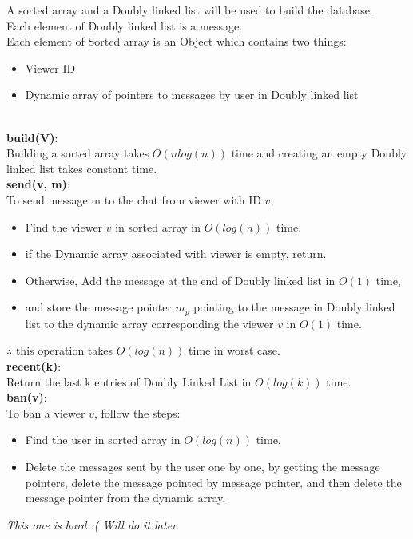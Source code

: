 \documentclass[12pt,twoside]{article}
\begin{document}
\begin{problems}
\newpage
\problem  %
A sorted array and a Doubly linked list will be used to build the database. \\
Each element of Doubly linked list is a message. \\
Each element of Sorted array is an Object which contains two things:
\begin{itemize}
    \item Viewer ID
    \item Dynamic array of pointers to messages by user in Doubly linked list
\end{itemize}
\\
\textbf{build(V)}:\\
Building a sorted array takes $O(nlog(n))$ time and creating an empty Doubly linked list takes constant time. \\

\textbf{send(v, m)}: \\
To send message m to the chat from viewer with ID $v$, \\
\begin{itemize}
    \item Find the viewer $v$ in sorted array in $O(log(n))$ time.
    \item if the Dynamic array associated with viewer is empty, return.
    \item Otherwise, Add the message at the end of Doubly linked list in $O(1)$ time,
    \item and store the message pointer $m_p$ pointing to the message in Doubly linked list to the dynamic array corresponding the viewer $v$ in $O(1)$ time.
\end{itemize}
$\therefore$ this operation takes $O(log(n))$ time in worst case. \\

\textbf{recent(k)}: \\
Return the last k entries of Doubly Linked List in $O(log(k))$ time. \\

\textbf{ban(v)}: \\
To ban a viewer $v$, follow the steps:
\begin{itemize}
    \item Find the user in sorted array in $O(log(n))$ time.
    \item Delete the messages sent by the user one by one, by getting the message pointers, delete the message pointed by message pointer, and then delete the message pointer from the dynamic array.
\end{itemize}

\newpage
\problem  %
\textit{This one is hard :( Will do it later}
\begin{problemparts}
\problempart %
\problempart %
\problempart 
\end{problemparts}

\end{problems}
\end{document}
